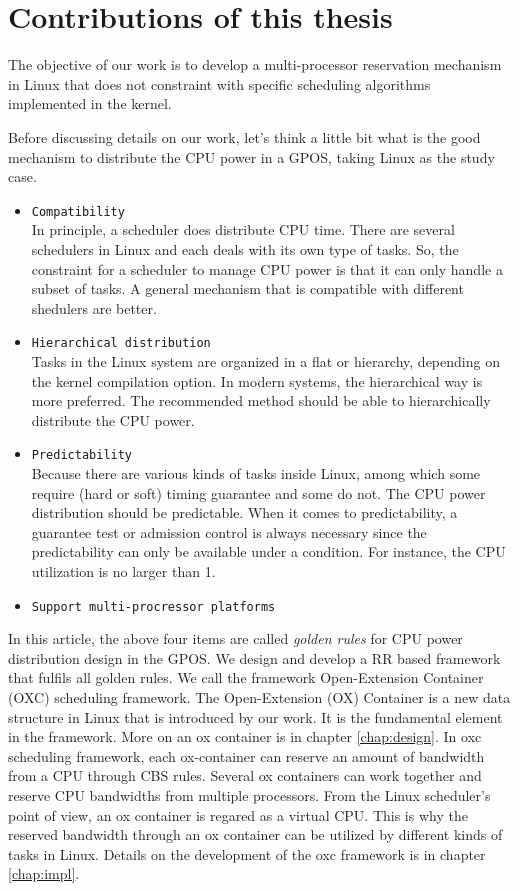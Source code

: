 \section{Contributions of this thesis}

The objective of our work is to develop a multi-processor 
reservation mechanism in Linux that does not constraint with specific 
scheduling algorithms implemented in the kernel.

%
Before discussing details on our work, let's think a little bit what
is the good mechanism to distribute the CPU power in a GPOS, taking 
Linux as the study case. 
\begin{itemize}

\item   {\texttt{Compatibility}}\\
	In principle, a scheduler does distribute CPU time. There are 
	several schedulers in Linux and each deals with its own type 
	of tasks. So, the constraint for a scheduler to manage CPU 
	power is that it can only handle a subset of tasks. A general 
	mechanism that is compatible with different shedulers are better.  
\item 	{\texttt{Hierarchical distribution}}\\
	Tasks in the Linux system are organized in a flat or hierarchy, 
	depending on the kernel compilation option. In modern systems, the 
	hierarchical way is more preferred. The recommended method should 
	be able to hierarchically distribute the CPU power.
\item 	{\texttt{Predictability}}\\
	Because there are various kinds of tasks inside Linux, among which
	some require (hard or soft) timing guarantee and some do not. 
	The CPU power distribution should be predictable. When it comes to 
	predictability, a guarantee test or admission control is always 
	necessary since the predictability can only be available under 
	a condition. For instance, the CPU utilization is no larger than 1. 
\item	{\texttt{Support multi-procressor platforms}}
\end{itemize}
In this article, the above four items are called \emph{golden rules} 
for CPU power distribution design in the GPOS. We design and develop 
a RR based framework that fulfils all golden rules. 
We call the framework Open-Extension Container (OXC) scheduling
framework. The Open-Extension (OX) Container is a new data structure in
Linux that is introduced by our work.  It is the fundamental element
in the framework. More on an ox container is in chapter \ref{chap:design}. 
In oxc scheduling framework, each ox-container can reserve an amount of 
bandwidth from a CPU through CBS rules. Several ox containers can work
together and reserve CPU bandwidths from multiple processors. From the 
Linux scheduler's point of view, an ox container is regared as a virtual 
CPU. This is why the reserved bandwidth through an ox container can be 
utilized by different kinds of tasks in Linux. Details on the development 
of the oxc framework is in chapter \ref{chap:impl}.

